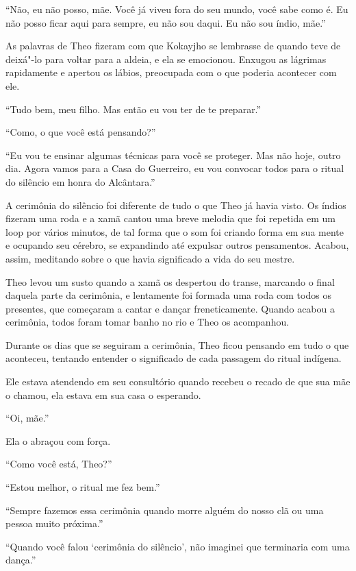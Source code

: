 ``Não, eu não posso, mãe. Você já viveu fora do seu mundo, você sabe
como é. Eu não posso ficar aqui para sempre, eu não sou daqui. Eu não
sou índio, mãe.''

As palavras de Theo fizeram com que Kokayjho se lembrasse de quando teve
de deixá"-lo para voltar para a aldeia, e ela se emocionou. Enxugou as
lágrimas rapidamente e apertou os lábios, preocupada com o que poderia
acontecer com ele.

``Tudo bem, meu filho. Mas então eu vou ter de te preparar.''

``Como, o que você está pensando?''

``Eu vou te ensinar algumas técnicas para você se proteger. Mas não
hoje, outro dia. Agora vamos para a Casa do Guerreiro, eu vou convocar
todos para o ritual do silêncio em honra do Alcântara.''

\asterisc


A cerimônia do silêncio foi diferente de tudo o que Theo já havia visto.
Os índios fizeram uma roda e a xamã cantou uma breve melodia que foi
repetida em um loop por vários minutos, de tal forma que o som foi
criando forma em sua mente e ocupando seu cérebro, se expandindo até
expulsar outros pensamentos. Acabou, assim, meditando sobre o que havia
significado a vida do seu mestre.

Theo levou um susto quando a xamã os despertou do transe, marcando o
final daquela parte da cerimônia, e lentamente foi formada uma roda com
todos os presentes, que começaram a cantar e dançar freneticamente.
Quando acabou a cerimônia, todos foram tomar banho no rio e Theo os
acompanhou.

Durante os dias que se seguiram a cerimônia, Theo ficou pensando em tudo
o que aconteceu, tentando entender o significado de cada passagem do
ritual indígena.

Ele estava atendendo em seu consultório quando recebeu o recado de que
sua mãe o chamou, ela estava em sua casa o esperando.

``Oi, mãe.''

Ela o abraçou com força.

``Como você está, Theo?''

``Estou melhor, o ritual me fez bem.''

``Sempre fazemos essa cerimônia quando morre alguém do nosso clã ou uma
pessoa muito próxima.''

``Quando você falou `cerimônia do silêncio', não imaginei que terminaria
com uma dança.''

